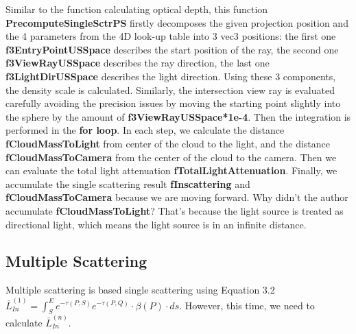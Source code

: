 Similar to the function calculating optical depth, this function \textbf{PrecomputeSingleSctrPS} firstly decomposes the given projection position and the 4 parameters from the 4D look-up table into 3 vec3 positions: the first one \textbf{f3EntryPointUSSpace} describes the start position of the ray, the second one \textbf{f3ViewRayUSSpace} describes the ray direction, the last one \textbf{f3LightDirUSSpace} describes the light direction. Using these 3 components, the density scale is calculated. Similarly, the intersection view ray is evaluated carefully avoiding the precision issues by moving the starting point slightly into the sphere by the amount of \textbf{f3ViewRayUSSpace*1e-4}. Then the integration is performed in the \textbf{for loop}. In each step, we calculate the distance \textbf{fCloudMassToLight} from center of the cloud to the light, and the distance \textbf{fCloudMassToCamera} from the center of the cloud to the camera. Then we can evaluate the total light attenuation \textbf{fTotalLightAttenuation}. Finally, we accumulate the single scattering result \textbf{fInscattering} and \textbf{fCloudMassToCamera} because we are moving forward. Why didn't the author accumulate \textbf{fCloudMassToLight}? That's because the light source is treated as directional light, which means the light source is in an infinite distance.

\subsection{Multiple Scattering}
Multiple scattering is based single scattering using Equation 3.2 $\bar{L}^{(1)}_{In} = \int_{S}^{E}e^{-\tau(P,S)}e^{-\tau(P,Q)} \cdot \beta(P) \cdot ds$. However, this time, we need to calculate $\bar{L}^{(n)}_{In}$.
